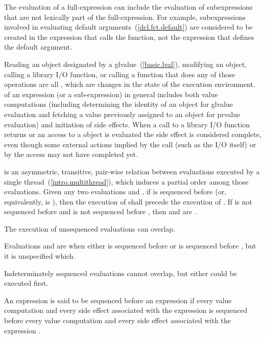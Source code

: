 \pnum
\begin{note} The evaluation of a full-expression can include the
evaluation of subexpressions that are not lexically part of the
full-expression. For example, subexpressions involved in evaluating
default arguments~(\ref{dcl.fct.default}) are considered to
be created in the expression that calls the function, not the expression
that defines the default argument. \end{note}

\pnum
{}%
Reading an object designated by a 
glvalue~(\ref{basic.lval}), modifying an object, calling a library I/O
function, or calling a function that does any of those operations are
all
, which are changes in the state of the execution
environment.  of an expression (or a
sub-expression) in general includes both value computations (including
determining the identity of an object for glvalue evaluation and fetching
a value previously assigned to an object for prvalue evaluation) and
initiation of side effects. When a call to a library I/O function
returns or an access to a  object is evaluated the side
effect is considered complete, even though some external actions implied
by the call (such as the I/O itself) or by the  access
may not have completed yet.

\pnum
{} is an asymmetric, transitive, pair-wise relation between
evaluations executed by a single thread~(\ref{intro.multithread}), which induces
a partial order among those evaluations. Given any two evaluations  and
, if  is sequenced before 
(or, equivalently,  is  ),
then the execution of
 shall precede the execution of . If  is not sequenced
before  and  is not sequenced before , then  and
 are . \begin{note} The execution of unsequenced
evaluations can overlap. \end{note} Evaluations  and  are
 when either  is sequenced before
 or  is sequenced before , but it is unspecified which.
\begin{note} Indeterminately sequenced evaluations cannot overlap, but either
could be executed first. \end{note}
An expression 
is said to be sequenced before
an expression  if
every value computation and every side effect
associated with the expression 
is sequenced before
every value computation and every side effect
associated with the expression .


